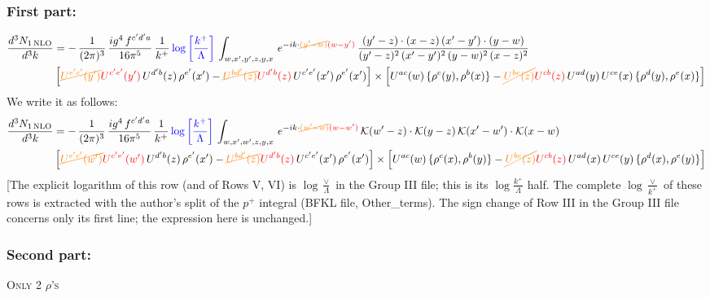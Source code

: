 \documentclass[9pt]{article}
\numberwithin{equation}{section}
\begin{document}
\subsubsection{First part:}
\begin{align}
     \frac{d^{3}N_{1\,\rm NLO}}{d^{3}k} & = -\,\frac{1}{(2\pi)^{3}}\, \frac{ig^{4}\,f^{c'd'a}}{16\pi^{5}}\, \frac{1}{k^{+}}\,{\color{blue}\log{\left[\frac{k^{+}}{\Lambda}\right]}}\, \int_{w,x',y',z,y,x}\, e^{-ik\cdot {\color{orange}\cancel{(y'-w)}}{\color{red}(w-y')}}\,\frac{(y'-z)\cdot (x-z)\,(x'-y')\cdot (y-w)}{(y'-z)^{2}\,(x'-y')^{2}\,(y-w)^{2}\,(x-z)^{2}}\notag \\ &  \left[{\color{orange}\cancel{U^{e'c'}(y')}}{\color{red}U^{c'e'}(y')}\,U^{d'b}(z)\,\rho^{e'}(x')-{\color{orange}\cancel{U^{bd'}(z)}}{\color{red}U^{d'b}(z)}\,U^{c'e'}(x')\,\rho^{e'}(x')\right]\times  \left[U^{ac}(w)\, \{\rho^{c}(y),\rho^{b}(x)\}-{\color{orange}\cancel{U^{bc}(z)}}{\color{red}U^{cb}(z)}\,U^{ad}(y)\,U^{ce}(x)\,\{\rho^{d}(y),\rho^{e}(x)\}\right]
\end{align} 
We write it as follows:
\begin{align}
     \frac{d^{3}N_{1\,\rm NLO}}{d^{3}k} & = -\,\frac{1}{(2\pi)^{3}}\, \frac{ig^{4}\,f^{c'd'a}}{16\pi^{5}}\, \frac{1}{k^{+}}\,{\color{blue}\log{\left[\frac{k^{+}}{\Lambda}\right]}}\, \int_{w,x',w',z,y,x}\, e^{-ik\cdot {\color{orange}\cancel{(w'-w)}}{\color{red}(w-w')}}\,\mathcal{K}(w'-z)\cdot \mathcal{K}(y-z)\,\mathcal{K}(x'-w')\cdot \mathcal{K}(x-w)\notag \\ &  \left[{\color{orange}\cancel{U^{e'c'}(w')}}{\color{red}U^{c'e'}(w')}\,U^{d'b}(z)\,\rho^{e'}(x')-{\color{orange}\cancel{U^{bd'}(z)}}{\color{red}U^{d'b}(z)}\,U^{c'e'}(x')\,\rho^{e'}(x')\right]\times  \left[U^{ac}(w)\, \{\rho^{c}(x),\rho^{b}(y)\}-{\color{orange}\cancel{U^{bc}(z)}}{\color{red}U^{cb}(z)}\,U^{ad}(x)\,U^{ce}(y)\,\{\rho^{d}(x),\rho^{e}(y)\}\right]
\end{align} {\color{red}[The explicit logarithm of this row (and of Rows V, VI) is $\log\frac{\vee}{\Lambda}$ in the Group III file; this is its $\log\frac{k^{+}}{\Lambda}$ half. The complete $\log\frac{\vee}{k^{+}}$ of these rows is extracted with the author's split of the $p^{+}$ integral (BFKL file, Other\_terms). The sign change of Row III in the Group III file concerns only its first line; the expression here is unchanged.]}\par\noindent
\subsubsection{Second part:}
\textsc{Only 2 $\rho$'s}
\end{document}
